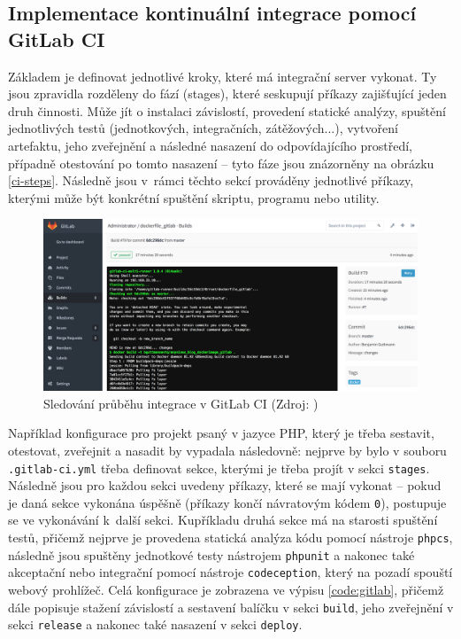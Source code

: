 \documentclass[FM,DP]{tulthesis}
\begin{document}
\subsection{Implementace kontinuální integrace pomocí GitLab CI}

Základem je definovat jednotlivé kroky, které má integrační server vykonat. Ty jsou zpravidla rozděleny do fází
(stages), které seskupují příkazy zajišťující jeden druh činnosti. Může jít o instalaci závislostí, 
provedení statické analýzy, spuštění jednotlivých testů (jednotkových, integračních, zátěžových...), vytvoření
artefaktu, jeho zveřejnění a následné nasazení do odpovídajícího prostředí, případně otestování po tomto nasazení --
tyto fáze jsou znázorněny na obrázku \ref{ci-steps}. Následně jsou v~rámci těchto sekcí prováděny jednotlivé
příkazy, kterými může být konkrétní spuštění skriptu, programu nebo utility.

\begin{figure}[h]
\center
\includegraphics[width=\textwidth]{gitlab.png}
\caption{Sledování průběhu integrace v GitLab CI (Zdroj: \cite{gitlab})}
\label{gitlab}
\end{figure}

Například konfigurace pro projekt psaný v jazyce PHP, který je třeba sestavit, otestovat, zveřejnit a nasadit
by vypadala následovně: nejprve by bylo v souboru \verb|.gitlab-ci.yml| třeba definovat sekce, kterými je třeba
projít v sekci \verb|stages|. Následně jsou pro každou sekci uvedeny příkazy, které se mají vykonat -- pokud je
daná sekce vykonána úspěšně (příkazy končí návratovým kódem \verb|0|), postupuje se ve vykonávání k~další sekci.
Kupříkladu druhá sekce má na starosti spuštění testů, přičemž nejprve je provedena statická analýza kódu pomocí
nástroje \verb|phpcs|, následně jsou spuštěny jednotkové testy nástrojem \verb|phpunit| a nakonec také akceptační
nebo integrační pomocí nástroje \verb|codeception|, který na pozadí spouští webový prohlížeč. Celá konfigurace
je zobrazena ve výpisu \ref{code:gitlab}, přičemž dále popisuje stažení závislostí a sestavení balíčku v sekci 
\verb|build|, jeho zveřejnění v sekci \verb|release| a nakonec také nasazení v sekci \verb|deploy|.
\end{document}
